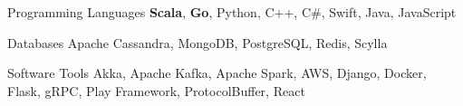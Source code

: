 

\begin{cvskills}

  \cvskill
    {Programming Languages} %
    {{\bf Scala}, {\bf Go}, Python, C++, C\#, Swift, Java, JavaScript} %

  \cvskill
    {Databases} %
    {Apache Cassandra, MongoDB, PostgreSQL, Redis, Scylla} %

  \cvskill
    {Software Tools} %
    {Akka, Apache Kafka, Apache Spark, AWS, Django, Docker, Flask, gRPC, Play Framework, ProtocolBuffer, React} %

\end{cvskills}

